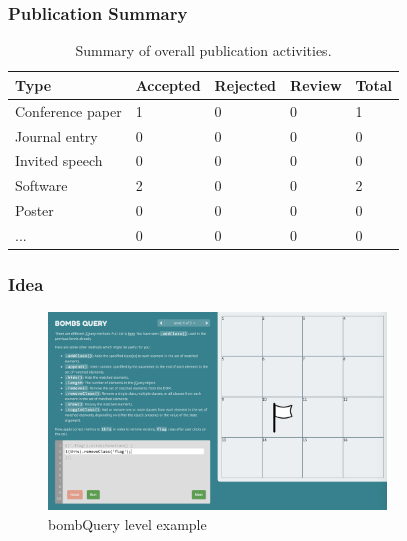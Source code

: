 \documentclass[10pt,xcolor=pdflatex]{beamer}
\begin{document}
\begin{frame}\frametitle{Publication Summary}
\begin{table}[]
\centering
\label{my-label}
\begin{tabular}{|l|l|l|l|l|}
\hline
Type             & Accepted & Rejected & Review & Total \\ \hline
Conference paper &   1      &   0      &  0     &  1    \\ \hline
Journal entry    &   0      &   0      &  0     &  0    \\ \hline
Invited speech   &   0      &   0      &  0     &  0    \\ \hline
Software         &   2      &   0      &  0     &  2    \\ \hline
Poster           &   0      &   0      &  0     &  0    \\ \hline
...              &   0      &   0      &  0     &  0    \\ \hline
\end{tabular}
\caption{Summary of overall publication activities.}
\end{table}
\end{frame}


\begin{frame}\frametitle{Idea}

   \begin{figure}[h!]
    \centering
      \includegraphics[width=0.8\textwidth]{img/screenshot.png}
      \caption{bombQuery level example}
  \end{figure}
\end{frame}


\end{document}
